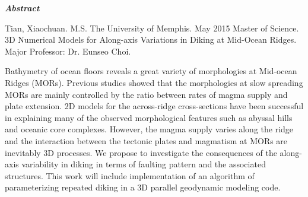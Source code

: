 \begin{center}
\textbf{\textit{Abstract}}
\end{center}

\vspace{0.5cm}

\begin{singlespace*}
Tian, Xiaochuan. M.S. The University of Memphis. May 2015 Master of Science. 3D Numerical Models for Along-axis Variations in Diking at Mid-Ocean Ridges. Major Professor: Dr. Eunseo Choi.
\end{singlespace*}

\vspace{0.5cm}

Bathymetry of ocean floors reveals a great variety of morphologies at Mid-ocean Ridges (MORs). Previous studies showed that the morphologies at slow spreading MORs are mainly controlled by the ratio between rates of magma supply and plate extension. 2D models for the across-ridge cross-sections have been successful in explaining many of the observed morphological features such as abyssal hills and oceanic core complexes. However, the magma supply varies along the ridge and the interaction between the tectonic plates and magmatism at MORs are inevitably 3D processes. We propose to investigate the consequences of the along-axis variability in diking in terms of faulting pattern and the associated structures. This work will include implementation of an algorithm of parameterizing repeated diking in a 3D parallel geodynamic modeling code.


